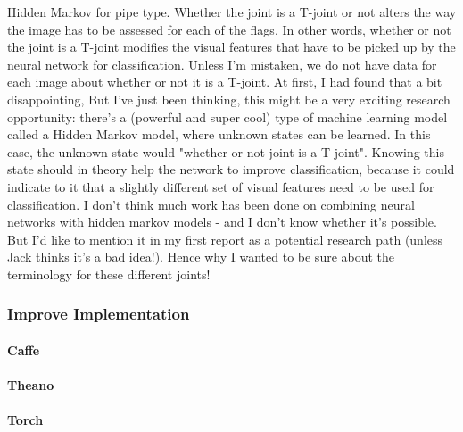 \documentclass[a4paper,11pt]{article}
\begin{document}
Hidden Markov for pipe type. Whether the joint is a T-joint or not alters the way the image has to be assessed for each of the flags. In other words, whether or not the joint is a T-joint modifies the visual features that have to be picked up by the neural network for classification.
Unless I'm mistaken, we do not have data for each image about whether or not it is a T-joint.
At first, I had found that a bit disappointing, But I've just been thinking, this might be a very exciting research opportunity: there's a (powerful and super cool) type of machine learning model called a Hidden Markov model, where unknown states can be learned. In this case, the unknown state would "whether or not joint is a T-joint". Knowing this state should in theory help the network to improve classification, because it could indicate to it that a slightly different set of visual features need to be used for classification.
I don't think much work has been done on combining neural networks with hidden markov models - and I don't know whether it's possible. But I'd like to mention it in my first report as a potential research path (unless Jack thinks it's a bad idea!). Hence why I wanted to be sure about the terminology for these different joints!


\subsubsection{Improve Implementation}

\paragraph{Caffe}

\paragraph{Theano}

\paragraph{Torch}

\clearpage
\end{document}

